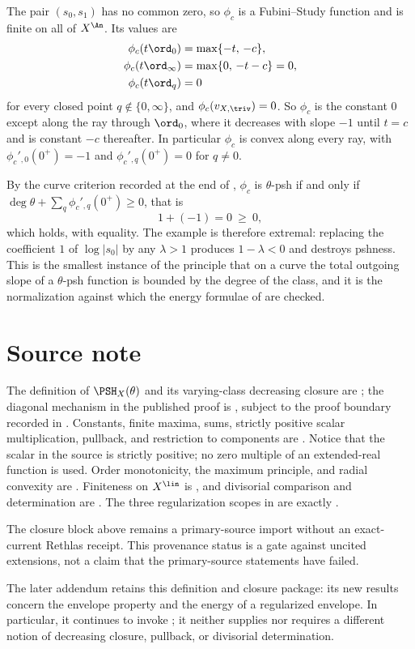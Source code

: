 \begin{example}
\label{ex:p1-fs-function}
The pair $(s_0,s_1)$ has no common zero, so $\phi_c$ is a Fubini--Study
function and is finite on all of $X^{\An}$.  Its values are
\[
 \begin{aligned}
  \phi_c(t\ord_0)&=\max\{-t,\,-c\},\\
  \phi_c(t\ord_\infty)&=\max\{0,\,-t-c\}=0,\\
  \phi_c(t\ord_q)&=0
 \end{aligned}
\]
for every closed point $q\notin\{0,\infty\}$, and
$\phi_c(v_{X,\triv})=0$.  So $\phi_c$ is the constant $0$ except along
the ray through $\ord_0$, where it decreases with slope $-1$ until
$t=c$ and is constant $-c$ thereafter.  In particular $\phi_c$ is
convex along every ray, with
$\phi_c'{}_{,0}(0^+)=-1$ and $\phi_c'{}_{,q}(0^+)=0$ for $q\ne0$.

By the curve criterion recorded at the end of
, $\phi_c$ is $\theta$-psh if and only if
$\deg\theta+\sum_q\phi_c'{}_{,q}(0^+)\ge0$, that is
\[
 1+(-1)=0\ \ge\ 0 ,
\]
which holds, with equality.  The example is therefore extremal: replacing
the coefficient $1$ of $\log|s_0|$ by any $\lambda>1$ produces
$1-\lambda<0$ and destroys pshness.  This is the smallest instance of the
principle that on a curve the total outgoing slope of a $\theta$-psh
function is bounded by the degree of the class, and it is the normalization
against which the energy formulae of  are checked.
\end{example}

\section{Source note}

The definition of $\PSH_X(\theta)$ and its varying-class decreasing
closure are \cite[Definition~4.1 and Theorem~4.5]{BJ22}; the diagonal
mechanism in the published proof is \cite[Lemma~4.6]{BJ22}, subject to
the proof boundary recorded in .
Constants, finite maxima, sums,
strictly positive scalar multiplication, pullback, and restriction to
components are \cite[Theorem~4.7]{BJ22}.  Notice that the scalar in the
source is strictly positive; no zero multiple of an extended-real function
is used.  Order monotonicity, the maximum principle, and radial convexity
are \cite[Proposition~4.12]{BJ22}.  Finiteness on $X^{\lin}$ is
\cite[Corollary~4.17]{BJ22}, and divisorial comparison and determination are
\cite[Theorem~4.22 and Corollary~4.23]{BJ22}.
The three regularization scopes in  are
exactly \cite[Theorem~4.15\,(i)--(iii)]{BJ22}.

The closure block above remains a primary-source import without an
exact-current Rethlas receipt.  This provenance status is a gate against
uncited extensions, not a claim that the primary-source statements have
failed.

The later addendum \cite{BJ22b} retains this definition and closure package:
its new results concern the envelope property and the energy of a regularized
envelope.  In particular, it continues to invoke
\cite[Theorems~4.5 and~4.22]{BJ22}; it neither supplies nor requires a
different notion of decreasing closure, pullback, or divisorial
determination.
